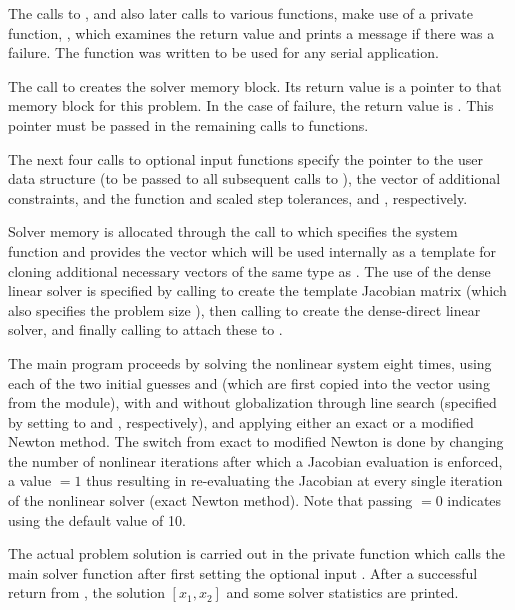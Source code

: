 The calls to , and also later calls to various 
functions, make use of a private function, , which examines
the return value and prints a message if there was a failure.  The
 function was written to be used for any serial {\sundials}
application.

The call to  creates the {\kinsol} solver memory block.
Its return value is a pointer to that memory block for this
problem.  In the case of failure, the return value is .  This
pointer must be passed in the remaining calls to {\kinsol} functions.

The next four calls to {\kinsol} optional input functions specify the 
pointer to the user data structure (to be passed to all subsequent calls
to ), the vector of additional constraints, and the function and
scaled step tolerances,  and , respectively.

Solver memory is allocated through the call to  which
specifies the system function  and provides the vector 
which will be used internally as a template for cloning additional necessary
vectors of the same type as . 
The use of the dense linear solver is specified by calling
 to create the template Jacobian matrix (which also
specifies the problem size ), then calling
 to create the dense-direct linear solver, and
finally calling  to attach these to {\kinsol}.

The main program proceeds by solving the nonlinear system eight times, using 
each of the two initial guesses  and  (which are first copied
into the vector  using  from
the {\nvecs} module), with and without globalization through line search
(specified by setting  to  and ,
respectively), and applying either an exact or a modified Newton method.
The switch from exact to modified Newton is done by changing the number of 
nonlinear iterations after which a Jacobian evaluation is enforced, a value
$=1$ thus resulting in re-evaluating the Jacobian at every single
iteration of the nonlinear solver (exact Newton method). Note that passing
$=0$ indicates using the default {\kinsol} value of 10.

The actual problem solution is carried out in the private function 
which calls the main solver function  after first setting the optional
input . After a successful return from , the solution
$[x_1, x_2]$ and some solver statistics are printed. 

